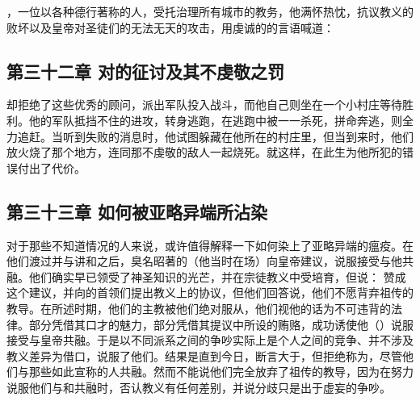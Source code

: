 ，一位以各种德行著称的人，受托治理所有城市的教务，他满怀热忱，抗议教义的败坏以及皇帝对圣徒们的无法无天的攻击，用虔诚的的言语喊道：\par


\subsection{第三十二章 对的征讨及其不虔敬之罚}

却拒绝了这些优秀的顾问，派出军队投入战斗，而他自己则坐在一个小村庄等待胜利。他的军队抵挡不住的进攻，转身逃跑，在逃跑中被一一杀死，拼命奔逃，则全力追赶。当听到失败的消息时，他试图躲藏在他所在的村庄里，但当到来时，他们放火烧了那个地方，连同那不虔敬的敌人一起烧死。就这样，在此生为他所犯的错误付出了代价。\par


\subsection{第三十三章 如何被亚略异端所沾染}

对于那些不知道情况的人来说，或许值得解释一下如何染上了亚略异端的瘟疫。在他们渡过并与讲和之后，臭名昭著的（他当时在场）向皇帝建议，说服接受与他共融。他们确实早已领受了神圣知识的光芒，并在宗徒教义中受培育，但说： 赞成这个建议，并向的首领们提出教义上的协议，但他们回答说，他们不愿背弃祖传的教导。在所述时期，他们的主教被他们绝对服从，他们视他的话为不可违背的法律。部分凭借其口才的魅力，部分凭借其提议中所设的贿赂，成功诱使他（）说服接受与皇帝共融。于是以不同派系之间的争吵实际上是个人之间的竞争、并不涉及教义差异为借口，说服了他们。结果是直到今日，断言大于，但拒绝称为，尽管他们与那些如此宣称的人共融。然而不能说他们完全放弃了祖传的教导，因为在努力说服他们与和共融时，否认教义有任何差别，并说分歧只是出于虚妄的争吵。\par

